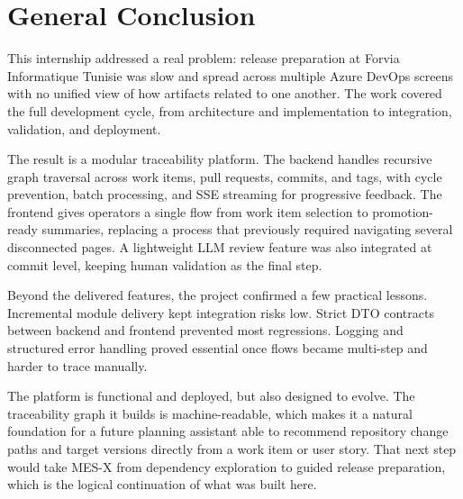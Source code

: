 \chapter*{General Conclusion}

This internship addressed a real problem: release preparation at Forvia
Informatique Tunisie was slow and spread across multiple Azure DevOps screens
with no unified view of how artifacts related to one another. The work covered
the full development cycle, from architecture and implementation to integration,
validation, and deployment.

The result is a modular traceability platform. The backend handles recursive
graph traversal across work items, pull requests, commits, and tags, with cycle
prevention, batch processing, and SSE streaming for progressive feedback. The
frontend gives operators a single flow from work item selection to
promotion-ready summaries, replacing a process that previously required
navigating several disconnected pages. A lightweight LLM review feature was
also integrated at commit level, keeping human validation as the final step.

Beyond the delivered features, the project confirmed a few practical lessons.
Incremental module delivery kept integration risks low. Strict DTO contracts
between backend and frontend prevented most regressions. Logging and structured
error handling proved essential once flows became multi-step and harder to
trace manually.

The platform is functional and deployed, but also designed to evolve. The
traceability graph it builds is machine-readable, which makes it a natural
foundation for a future planning assistant able to recommend repository change
paths and target versions directly from a work item or user story. That next
step would take MES-X from dependency exploration to guided release preparation,
which is the logical continuation of what was built here.